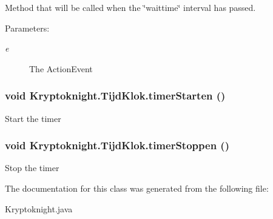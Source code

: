 Method that will be called when the \char`\"{}waittime\char`\"{} interval has passed. \begin{Desc}
\item[Parameters:]
\begin{description}
\item[{\em e}]The Action\-Event \end{description}
\end{Desc}
\hypertarget{class_kryptoknight_1_1_tijd_klok_c1}{
\subsubsection[timerStarten]{\setlength{\rightskip}{0pt plus 5cm}void Kryptoknight.Tijd\-Klok.timer\-Starten ()}}
\label{class_kryptoknight_1_1_tijd_klok_c1}


Start the timer \hypertarget{class_kryptoknight_1_1_tijd_klok_c2}{
\subsubsection[timerStoppen]{\setlength{\rightskip}{0pt plus 5cm}void Kryptoknight.Tijd\-Klok.timer\-Stoppen ()}}
\label{class_kryptoknight_1_1_tijd_klok_c2}


Stop the timer 

The documentation for this class was generated from the following file:\begin{CompactItemize}
\item 
Kryptoknight.java\end{CompactItemize}
